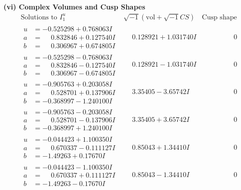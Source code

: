 \documentclass[1p]{elsarticle_modified}
\theoremstyle{definition}
\newcommand{\I}{\sqrt{-1}}
\begin{document}
\newpage\flushleft \textbf{(vi) Complex Volumes and Cusp Shapes}
$$\begin{array}{c|c|c}  
\text{Solutions to }I^u_{1}& \I (\text{vol} + \sqrt{-1}CS) & \text{Cusp shape}\\
 \hline 
\begin{aligned}
u &= -0.525298 + 0.768063 I \\
a &= \phantom{-}0.832846 + 0.127540 I \\
b &= \phantom{-}0.306967 + 0.674805 I\end{aligned}
 & \phantom{-}0.128921 + 1.031740 I & \phantom{-0.000000 } 0 \\ \hline\begin{aligned}
u &= -0.525298 - 0.768063 I \\
a &= \phantom{-}0.832846 - 0.127540 I \\
b &= \phantom{-}0.306967 - 0.674805 I\end{aligned}
 & \phantom{-}0.128921 - 1.031740 I & \phantom{-0.000000 } 0 \\ \hline\begin{aligned}
u &= -0.905763 + 0.203058 I \\
a &= \phantom{-}0.528701 + 0.137906 I \\
b &= -0.368997 - 1.240100 I\end{aligned}
 & \phantom{-}3.35405 - 3.65742 I & \phantom{-0.000000 } 0 \\ \hline\begin{aligned}
u &= -0.905763 - 0.203058 I \\
a &= \phantom{-}0.528701 - 0.137906 I \\
b &= -0.368997 + 1.240100 I\end{aligned}
 & \phantom{-}3.35405 + 3.65742 I & \phantom{-0.000000 } 0 \\ \hline\begin{aligned}
u &= -0.044423 + 1.100350 I \\
a &= \phantom{-}0.670337 - 0.111127 I \\
b &= -1.49263 + 0.17670 I\end{aligned}
 & \phantom{-}0.85043 + 1.34410 I & \phantom{-0.000000 } 0 \\ \hline\begin{aligned}
u &= -0.044423 - 1.100350 I \\
a &= \phantom{-}0.670337 + 0.111127 I \\
b &= -1.49263 - 0.17670 I\end{aligned}
 & \phantom{-}0.85043 - 1.34410 I & \phantom{-0.000000 } 0 \\ \hline\begin{aligned}

\end{aligned}
\end{array}$$
\end{document}
